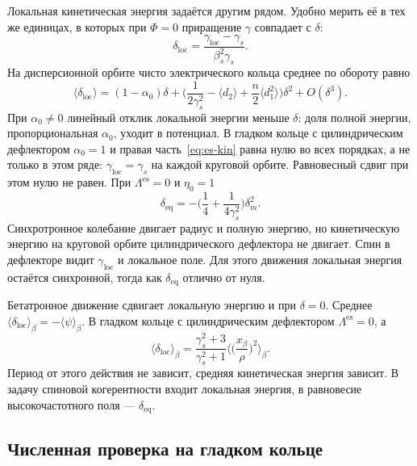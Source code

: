 Локальная кинетическая энергия задаётся другим рядом. Удобно мерить её в тех же единицах, в которых при $\Phi=0$ приращение $\gamma$ совпадает с $\delta$:
\begin{equation}
\label{eq:es-dloc}
\delta_{\mathrm{loc}}
=\frac{\gamma_{\mathrm{loc}}-\gamma_s}{\beta_s^2\gamma_s}.
\end{equation}
На дисперсионной орбите чисто электрического кольца среднее по обороту равно
\begin{equation}
\label{eq:es-kin}
\langle\delta_{\mathrm{loc}}\rangle
=(1-\alpha_0)\delta
+\Biggl(
\frac{1}{2\gamma_s^2}
-\langle d_2\rangle
+\frac{n}{2}\Biggl\langle d_1^2\Biggr\rangle
\Biggr)\delta^2+O(\delta^3).
\end{equation}
При $\alpha_0\neq 0$ линейный отклик локальной энергии меньше $\delta$: доля полной энергии, пропорциональная $\alpha_0$, уходит в потенциал. В гладком кольце с цилиндрическим дефлектором $\alpha_0=1$ и правая часть~\eqref{eq:es-kin} равна нулю во всех порядках, а не только в этом ряде: $\gamma_{\mathrm{loc}}=\gamma_s$ на каждой круговой орбите. Равновесный сдвиг при этом нулю не равен. При $\Lambda^{\mathrm{es}}=0$ и $\eta_0=1$
\begin{equation}
\label{eq:es-deq-cyl}
\delta_{\mathrm{eq}}
=-\Biggl(\frac14+\frac{1}{4\gamma_s^2}\Biggr)\delta_m^2.
\end{equation}
Синхротронное колебание двигает радиус и полную энергию, но кинетическую энергию на круговой орбите цилиндрического дефлектора не двигает. Спин в дефлекторе видит $\gamma_{\mathrm{loc}}$ и локальное поле. Для этого движения локальная энергия остаётся синхронной, тогда как $\delta_{\mathrm{eq}}$ отлично от нуля.

Бетатронное движение сдвигает локальную энергию и при $\delta=0$. Среднее $\langle\delta_{\mathrm{loc}}\rangle_\beta=-\langle\psi\rangle_\beta$. В гладком кольце с цилиндрическим дефлектором $\Lambda^{\mathrm{es}}=0$, а
\begin{equation}
\label{eq:es-kin-beta}
\langle\delta_{\mathrm{loc}}\rangle_\beta
=\frac{\gamma_s^2+3}{\gamma_s^2+1}
\Biggl\langle\Biggl(\frac{x_\beta}{\rho}\Biggr)^2\Biggr\rangle_\beta.
\end{equation}
Период от этого действия не зависит, средняя кинетическая энергия зависит. В задачу спиновой когерентности входит локальная энергия, в равновесие высокочастотного поля --- $\delta_{\mathrm{eq}}$.

\subsection{Численная проверка на гладком кольце}
\label{sec:es-num}

